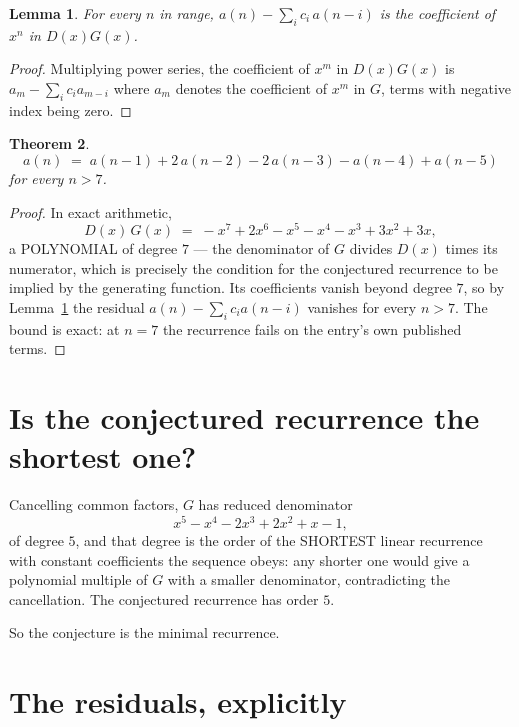 \documentclass[11pt,a4paper]{article}
\theoremstyle{plain}
\newtheorem{theorem}{Theorem}
\newtheorem{lemma}[theorem]{Lemma}
\theoremstyle{definition}
\begin{document}
\begin{lemma}\label{lem:key}
For every $n$ in range, $a(n)-\sum_i c_i\,a(n-i)$ is the coefficient of $x^{n}$ in
$D(x)G(x)$.
\end{lemma}

\begin{proof}
Multiplying power series, the coefficient of $x^{m}$ in $D(x)G(x)$ is
$a_m-\sum_i c_i a_{m-i}$ where $a_m$ denotes the coefficient of $x^{m}$ in $G$, terms with
negative index being zero.
\end{proof}

\begin{theorem}
\[
a(n)\;=\;a(n-1) + 2\,a(n-2) - 2\,a(n-3) - a(n-4) + a(n-5)
\]
for every $n>7$.
\end{theorem}

\begin{proof}
In exact arithmetic,
\[
D(x)\,G(x)\;=\;- x^{7} + 2 x^{6} - x^{5} - x^{4} - x^{3} + 3 x^{2} + 3 x,
\]
a POLYNOMIAL of degree $7$ --- the denominator of $G$ divides $D(x)$ times its numerator,
which is precisely the condition for the conjectured recurrence to be implied by the
generating function. Its coefficients vanish beyond degree $7$, so by
Lemma~\ref{lem:key} the residual $a(n)-\sum_ic_ia(n-i)$ vanishes for every
$n>7$. The bound is exact: at $n=7$ the recurrence fails on the entry's own published terms.
\end{proof}

\section{Is the conjectured recurrence the shortest one?}

Cancelling common factors, $G$ has reduced denominator
\[
x^{5} - x^{4} - 2 x^{3} + 2 x^{2} + x - 1,
\]
of degree $5$, and that degree is the order of the SHORTEST linear recurrence with
constant coefficients the sequence obeys: any shorter one would give a polynomial multiple of
$G$ with a smaller denominator, contradicting the cancellation. The conjectured recurrence has
order $5$.

So the conjecture is the minimal recurrence.

\section{The residuals, explicitly}
\end{document}
